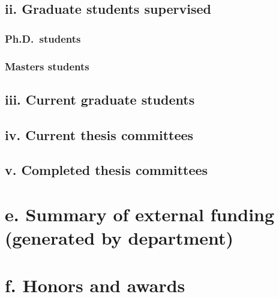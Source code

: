\documentclass{article}
\begin{document}


\subsection*{ii. Graduate students supervised}

\subsubsection*{Ph.D.~students}



\subsubsection*{Masters students}



\subsection*{iii. Current graduate students}



\subsection*{iv. Current thesis committees}



\subsection*{v. Completed thesis committees}




\section*{e. Summary of external funding (generated by department)}


\section*{f. Honors and awards}
\end{document}
